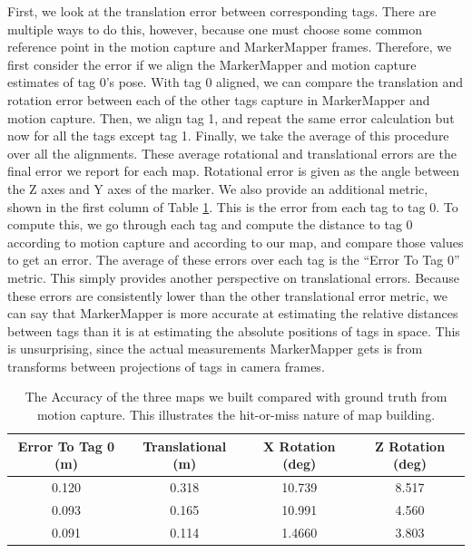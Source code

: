 \documentclass{article}
\begin{document}
    First, we look at the translation error between corresponding tags. There are multiple ways to do this, however, because one must choose some common reference point in the motion capture and MarkerMapper frames. Therefore, we first consider the error if we align the MarkerMapper and motion capture estimates of tag 0's pose. With tag 0 aligned, we can compare the translation and rotation error between each of the other tags capture in MarkerMapper and motion capture. Then, we align tag 1, and repeat the same error calculation but now for all the tags except tag 1. Finally, we take the average of this procedure over all the alignments. These average rotational and translational errors are the final error we report for each map. Rotational error is given as the angle between the Z axes and Y axes of the marker. We also provide an additional metric, shown in the first column of Table \ref{table:markermapper_accuracy}. This is the error from each tag to tag 0. To compute this, we go through each tag and compute the distance to tag 0 according to motion capture and according to our map, and compare those values to get an error. The average of these errors over each tag is the ``Error To Tag 0'' metric. This simply provides another perspective on translational errors. Because these errors are consistently lower than the other translational error metric, we can say that MarkerMapper is more accurate at estimating the relative distances between tags than it is at estimating the absolute positions of tags in space. This is unsurprising, since the actual measurements MarkerMapper gets is from transforms between projections of tags in camera frames.

    \begin{table}[H]
      \centering
      \begin{tabular}{|c|c|c|c|} \hline
        Error To Tag 0 (m) & Translational (m) & X Rotation (deg) & Z Rotation (deg) \\ \hline
        0.120 & 0.318 & 10.739 & 8.517 \\ \hline
        0.093 & 0.165 & 10.991 & 4.560 \\ \hline
        0.091 & 0.114 & 1.4660 & 3.803 \\ \hline
      \end{tabular}
      \caption{The Accuracy of the three maps we built compared with ground truth from motion capture. This illustrates the hit-or-miss nature of map building.}
      \label{table:markermapper_accuracy}
    \end{table}
\end{document}
